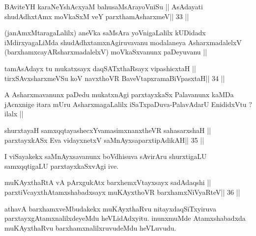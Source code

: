 

\begin{shl}
BAviteYH karaNeYshAcxyaM bahusaMsArayoVniSu ||
AsAdayati shudAdhxtAmx moVkaSxM veY parxthamAsharxmeV\hfill || 33 ||
\end{shl}

\begin{artha}
(janAmxMtaragaLalilx) aneVka saMsAra yoVnigaLalilx kUDidadx
  iMdirxyagaLiMda shudAdhxtamxnAgiruvavanu modalaneya AsharxmadalelxV
  (barxhamxcayARsharxmadalelxV) moVkaSxvanunx paDeyuvanu ||
\end{artha}

\begin{shl}
tamAsAdayx tu mukatxsayx daqSATxthaRsayx vipashicxtaH ||
tirxSAvxsharxmeVSu koV navxthoVR BaveVtapxramaBiVpasxtaH\hfill || 34 ||
\end{shl}

\begin{artha}
A Asharxmavanunx paDedu mukatxnAgi parxtayxkaSx Palavanunx kaMDa
jAcnxnige itara mUru AsharxmagaLalilx iSaTxpaDuva-PalavAdarU
EnididxVtu ? ilalx ||
\end{artha}

\begin{shl}
shurxtayaH samxqqtayashecxYvamasimxnanxtheVR sahasarxshaH ||
parxtayxkASx Eva vidayxnetxV saMnAyxsaparxtipAdikAH\hfill || 35 ||
\end{shl}

\begin{artha}
I viSayakekx saMnAyxsavanunx boVdhisuva sAvirAru shurxtigaLU
samxqqtigaLU parxtayxkaSxvAgi ive.
\end{artha}


\begin{shl}
muKAyxthaRtA vA pArxgukAtx barxhemxVtayxsayx sadAdaqshi ||
parxtiVcayxthA\s tamxshabadxsayx muKAyxthoVR barxhamxNiVyaRteV\hfill || 36 ||
\end{shl}

\begin{artha}
athavA barxhamxveMbudakekx muKAyxthaRvu nitayxdaqSiTxyiruva
parxtayxgAtamxnalilxdeyeMdu heVLidAdxyitu. inunxmuMde Atamxshabadxda
muKAyxthaRvu barxhamxnalilxruvudeMdu heVLuvudu.
\end{artha}


